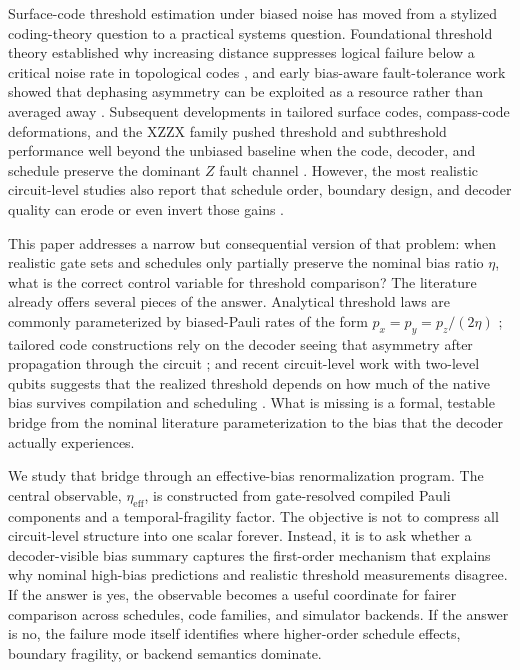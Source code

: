 \documentclass{article} %
\begin{document}
Surface-code threshold estimation under biased noise has moved from a stylized coding-theory question to a practical systems question. Foundational threshold theory established why increasing distance suppresses logical failure below a critical noise rate in topological codes \citep{dennis2002_topological_memory,wang2003_confinement_higgs,kitaev2003_anyons}, and early bias-aware fault-tolerance work showed that dephasing asymmetry can be exploited as a resource rather than averaged away \citep{aliferis2008_biased_noise,stephens2013_topological_biased,webster2015_reducing_overhead}. Subsequent developments in tailored surface codes, compass-code deformations, and the XZZX family pushed threshold and subthreshold performance well beyond the unbiased baseline when the code, decoder, and schedule preserve the dominant $Z$ fault channel \citep{tuckett2018_ultrahigh_threshold,tuckett2019_tailoring_surface_codes,li2019_compass_codes,bonilla2021_xzzx,xu2023_tailored_xzzx,dua2024_clifford_deformed}. However, the most realistic circuit-level studies also report that schedule order, boundary design, and decoder quality can erode or even invert those gains \citep{tuckett2020_fault_tolerant_thresholds,higgott2023_improved_decoding,tsai2024_temporal_fragility,martinez2025_two_level_circuit}.

This paper addresses a narrow but consequential version of that problem: when realistic gate sets and schedules only partially preserve the nominal bias ratio $\eta$, what is the correct control variable for threshold comparison? The literature already offers several pieces of the answer. Analytical threshold laws are commonly parameterized by biased-Pauli rates of the form $p_x = p_y = p_z/(2\eta)$ \citep{xiao2024_finite_size_corrections}; tailored code constructions rely on the decoder seeing that asymmetry after propagation through the circuit \citep{tuckett2020_fault_tolerant_thresholds,bonilla2021_xzzx}; and recent circuit-level work with two-level qubits suggests that the realized threshold depends on how much of the native bias survives compilation and scheduling \citep{martinez2025_two_level_circuit}. What is missing is a formal, testable bridge from the nominal literature parameterization to the bias that the decoder actually experiences.

We study that bridge through an effective-bias renormalization program. The central observable, $\eta_{\mathrm{eff}}$, is constructed from gate-resolved compiled Pauli components and a temporal-fragility factor. The objective is not to compress all circuit-level structure into one scalar forever. Instead, it is to ask whether a decoder-visible bias summary captures the first-order mechanism that explains why nominal high-bias predictions and realistic threshold measurements disagree. If the answer is yes, the observable becomes a useful coordinate for fairer comparison across schedules, code families, and simulator backends. If the answer is no, the failure mode itself identifies where higher-order schedule effects, boundary fragility, or backend semantics dominate.
\end{document}
